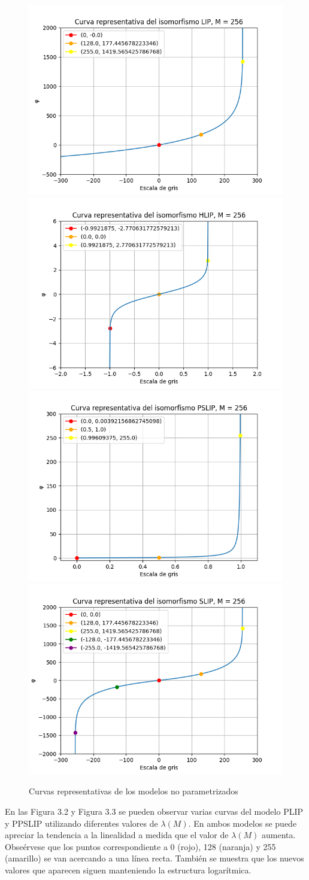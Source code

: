 \begin{figure}
	\begin{center}
		\includegraphics[width=5.5 cm]{images/clasics_curves/lip_curve.png}
		\includegraphics[width=5.5 cm]{images/clasics_curves/hlip_curve.png}
		\includegraphics[width=5.5 cm]{images/clasics_curves/pslip_curve.png}
		\includegraphics[width=5.5 cm]{images/clasics_curves/slip_curve.png}
		\caption{Curvas representativas de los modelos no parametrizados}
	\end{center}
\end{figure}

En las Figura 3.2 y Figura 3.3 se pueden observar varias curvas del modelo PLIP y PPSLIP utilizando diferentes valores de $\lambda(M)$. En ambos modelos se puede apreciar la tendencia a la linealidad a medida que el valor de $\lambda(M)$ aumenta. Obse\'ervese que los puntos correspondiente a 0 (rojo), 128 (naranja) y 255 (amarillo) se van acercando a una l\'inea recta. Tambi\'en se muestra que los nuevos valores que aparecen siguen manteniendo la estructura logar\'itmica.

